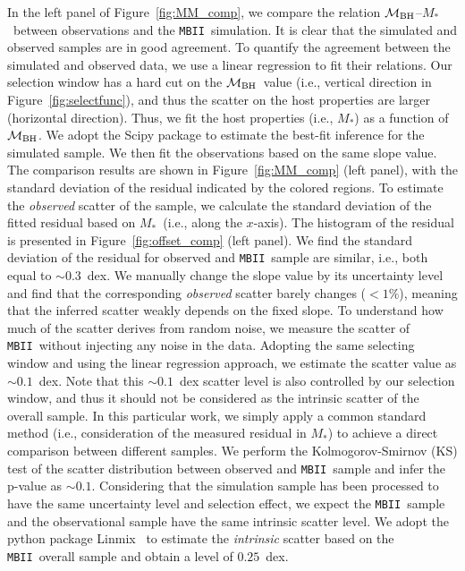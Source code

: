 \documentclass[twocolumn,trackchanges]{aastex63}
\newcommand{\mbh}{$\mathcal M_{\rm BH}$}
\newcommand{\mstar}{{$M_*$}}
\newcommand{\mbii}{\texttt{MBII}}
\begin{document}
In the left panel of Figure~\ref{fig:MM_comp}, we compare the relation \mbh--\mstar~between observations and the \mbii\ simulation. It is clear that the simulated and observed samples are in good agreement. 
To quantify the agreement between the simulated and observed data, we use a linear regression to fit their relations. Our selection window has a hard cut on the \mbh\ value (i.e., vertical direction in Figure~\ref{fig:selectfunc}), and thus the scatter on the host properties are larger (horizontal direction). Thus, we fit the host properties (i.e., \mstar) as a function of \mbh. We adopt the {\sc Scipy} package to estimate the best-fit inference for the simulated sample. We then fit the observations based on the same slope value. The comparison results are shown in Figure~\ref{fig:MM_comp} (left panel), with the standard deviation of the residual indicated by the colored regions.
To estimate the {\it observed} scatter of the sample, we calculate the standard deviation of the fitted residual based on \mstar\ (i.e., along the $x$-axis). The histogram of the residual is presented in Figure~\ref{fig:offset_comp} (left panel). We find the standard deviation of the residual for observed and \mbii\ sample are similar, i.e., both equal to $\sim0.3$~dex. We manually change the slope value by its uncertainty level and find that the corresponding {\it observed} scatter barely changes ($<1\%$), meaning that the inferred scatter weakly depends on the fixed slope. To understand how much of the scatter derives from random noise, we measure the scatter of \mbii\ without injecting any noise in the data. Adopting the same selecting window and using the linear regression approach, we estimate the scatter value as $\sim0.1$~dex. Note that this $\sim0.1$~dex scatter level is also controlled by our selection window, and thus it should not be considered as the intrinsic scatter of the overall sample. In this particular work, we simply apply a common standard method (i.e., consideration of the measured residual in \mstar) to achieve a direct comparison between different samples. We perform the Kolmogorov-Smirnov (KS) test of the scatter distribution between observed and \mbii\ sample and infer the p-value as $\sim0.1$. Considering that the simulation sample has been processed to have the same uncertainty level and selection effect, we expect the \mbii\ sample and the observational sample have the same intrinsic scatter level. We adopt the python package {\sc Linmix}~\citep{Kelly2007} to estimate the {\it intrinsic} scatter based on the \mbii\ overall sample and obtain a level of $0.25$~dex.
\end{document}
